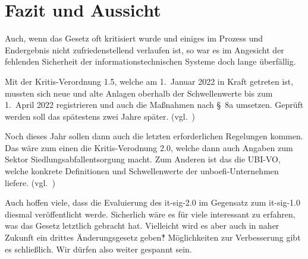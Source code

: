 \chapter{Fazit und Aussicht}\label{ch:fazit-und-aussicht}
Auch, wenn das Gesetz oft kritisiert wurde und einiges im Prozess und Endergebnis nicht zufriedenstellend verlaufen ist,
so war es im Angesicht der fehlenden Sicherheit der informationstechnischen Systeme doch lange überfällig.

Mit der Kritis-Verordnung 1.5, welche am 1.\ Januar 2022 in Kraft getreten ist,
mussten sich neue und alte Anlagen oberhalb der Schwellenwerte bis zum 1.\ April 2022 registrieren
und auch die Maßnahmen nach §~8a umsetzen.
Geprüft werden soll das spätestens zwei Jahre später.
(vgl.~\cite{kritis-verodnun-2021})

Noch dieses Jahr sollen dann auch die letzten erforderlichen Regelungen kommen.
Das wäre zum einen die Kritis-Verodnung 2.0, welche dann auch Angaben zum Sektor Siedlungsabfallentsorgung macht.
Zum Anderen ist das die UBI-VO, welche konkrete Definitionen und Schwellenwerte der \acrshort{unboefi}-Unternehmen liefere.
(vgl.~\cite{kritis-verodnun-2021})

Auch hoffen viele, dass die Evaluierung des \acrshort{it-sig-2.0} im Gegensatz zum \acrshort{it-sig-1.0} diesmal veröffentlicht werde.
Sicherlich wäre es für viele interessant zu erfahren, was das Gesetz letztlich gebracht hat.
Vielleicht wird es aber auch in naher Zukunft ein drittes Änderungsgesetz geben‽
Möglichkeiten zur Verbesserung gibt es schließlich.
Wir dürfen also weiter gespannt sein.
